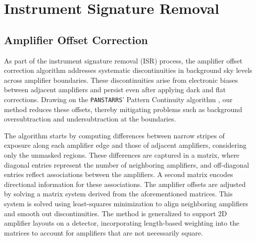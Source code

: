 \section{Instrument Signature Removal}
\label{sec:isr}

\subsection{Amplifier Offset Correction}
\label{sec:isr:ampoffset}
As part of the instrument signature removal (ISR) process, the amplifier offset
correction algorithm addresses systematic discontinuities in background sky
levels across amplifier boundaries. These discontinuities arise from electronic
biases between adjacent amplifiers and persist even after applying dark and
flat corrections. Drawing on the \texttt{PANSTARRS}' Pattern Continuity
algorithm \citep{2020ApJS..251....4W}, our method reduces these offsets,
thereby mitigating problems such as background oversubtraction and
undersubtraction at the boundaries.

The algorithm starts by computing differences between narrow stripes of
exposure along each amplifier edge and those of adjacent amplifiers,
considering only the unmasked regions. These differences are captured in a
matrix, where diagonal entries represent the number of neighboring amplifiers,
and off-diagonal entries reflect associations between the amplifiers. A second
matrix encodes directional information for these associations.
The amplifier offsets are adjusted by solving a matrix system derived from the
aforementioned matrices. This system is solved using least-squares minimization
to align neighboring amplifiers and smooth out discontinuities. The method is
generalized to support 2D amplifier layouts on a detector, incorporating
length-based weighting into the matrices to account for amplifiers that are not
necessarily square.